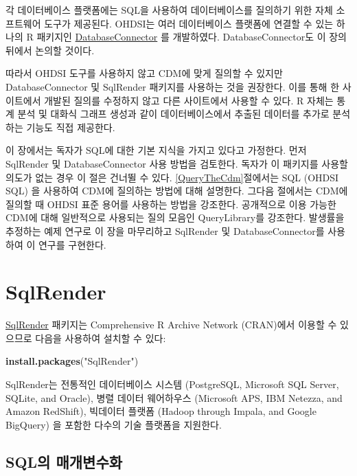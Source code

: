 \documentclass[11pt]{book}
\newenvironment{Shaded}{\begin{snugshade}}{\end{snugshade}}
\newcommand{\KeywordTok}[1]{\textcolor[rgb]{0.13,0.29,0.53}{\textbf{#1}}}
\newcommand{\StringTok}[1]{\textcolor[rgb]{0.31,0.60,0.02}{#1}}
\newcommand{\NormalTok}[1]{#1}
\theoremstyle{definition}
\theoremstyle{definition}
\theoremstyle{definition}
\theoremstyle{remark}
\begin{document}
각 데이터베이스 플랫폼에는 SQL을 사용하여 데이터베이스를 질의하기 위한
자체 소프트웨어 도구가 제공된다. OHDSI는 여러 데이터베이스 플랫폼에
연결할 수 있는 하나의 R 패키지인
\href{https://ohdsi.github.io/DatabaseConnector/}{DatabaseConnector} 를
개발하였다. DatabaseConnector도 이 장의 뒤에서 논의할 것이다.

따라서 OHDSI 도구를 사용하지 않고 CDM에 맞게 질의할 수 있지만
DatabaseConnector 및 SqlRender 패키지를 사용하는 것을 권장한다. 이를
통해 한 사이트에서 개발된 질의를 수정하지 않고 다른 사이트에서 사용할 수
있다. R 자체는 통계 분석 및 대화식 그래프 생성과 같이 데이터베이스에서
추출된 데이터를 추가로 분석하는 기능도 직접 제공한다. 

이 장에서는 독자가 SQL에 대한 기본 지식을 가지고 있다고 가정한다. 먼저
SqlRender 및 DatabaseConnector 사용 방법을 검토한다. 독자가 이 패키지를
사용할 의도가 없는 경우 이 절은 건너뛸 수 있다.
\ref{QueryTheCdm}절에서는 SQL (OHDSI SQL) 을 사용하여 CDM에 질의하는
방법에 대해 설명한다. 그다음 절에서는 CDM에 질의할 때 OHDSI 표준 용어를
사용하는 방법을 강조한다. 공개적으로 이용 가능한 CDM에 대해 일반적으로
사용되는 질의 모음인 QueryLibrary를 강조한다. 발생률을 추정하는 예제
연구로 이 장을 마무리하고 SqlRender 및 DatabaseConnector를 사용하여 이
연구를 구현한다. 

\hypertarget{SqlRender}{\section{SqlRender}\label{SqlRender}}

\href{https://ohdsi.github.io/SqlRender/}{SqlRender} 패키지는
Comprehensive R Archive Network (CRAN)에서 이용할 수 있으므로 다음을
사용하여 설치할 수 있다:

\begin{Shaded}
\begin{Highlighting}[]
\KeywordTok{install.packages}\NormalTok{(}\StringTok{"SqlRender"}\NormalTok{)}
\end{Highlighting}
\end{Shaded}

SqlRender는 전통적인 데이터베이스 시스템 (PostgreSQL, Microsoft SQL
Server, SQLite, and Oracle), 병렬 데이터 웨어하우스 (Microsoft APS, IBM
Netezza, and Amazon RedShift), 빅데이터 플랫폼 (Hadoop through Impala,
and Google BigQuery) 을 포함한 다수의 기술 플랫폼을 지원한다.

\subsection{SQL의 매개변수화}\label{sql-}
\end{document}
